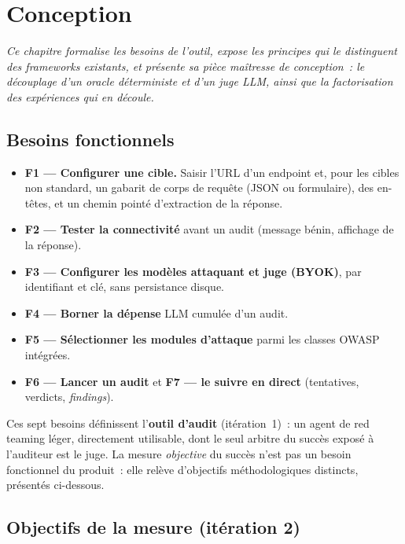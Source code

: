 \chapter{Conception}
\label{chap:conception}

\noindent\itshape
Ce chapitre formalise les besoins de l'outil, expose les principes qui le distinguent des frameworks existants, et présente sa pièce maîtresse de conception~: le découplage d'un oracle déterministe et d'un juge LLM, ainsi que la factorisation des expériences qui en découle.
\normalfont
\vspace{0.5cm}

\section{Besoins fonctionnels}

\begin{itemize}
  \item \textbf{F1 --- Configurer une cible.} Saisir l'URL d'un endpoint et, pour les cibles non standard, un gabarit de corps de requête (JSON ou formulaire), des en-têtes, et un chemin pointé d'extraction de la réponse.
  \item \textbf{F2 --- Tester la connectivité} avant un audit (message bénin, affichage de la réponse).
  \item \textbf{F3 --- Configurer les modèles attaquant et juge (BYOK)}, par identifiant et clé, sans persistance disque.
  \item \textbf{F4 --- Borner la dépense} LLM cumulée d'un audit.
  \item \textbf{F5 --- Sélectionner les modules d'attaque} parmi les classes OWASP intégrées.
  \item \textbf{F6 --- Lancer un audit} et \textbf{F7 --- le suivre en direct} (tentatives, verdicts, \emph{findings}).
\end{itemize}

\noindent Ces sept besoins définissent l'\textbf{outil d'audit} (itération~1)~: un agent de red teaming léger, directement utilisable, dont le seul arbitre du succès exposé à l'auditeur est le juge. La mesure \emph{objective} du succès n'est pas un besoin fonctionnel du produit~: elle relève d'objectifs méthodologiques distincts, présentés ci-dessous.

\section{Objectifs de la mesure (itération 2)}

